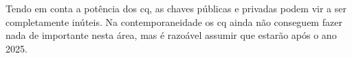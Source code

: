 \documentclass{report}
\begin{document}
\begin{figure}[!h]
	\centering
	\qquad
\end{figure}	

	Tendo em conta a potência dos \ac{cq}, as chaves públicas e privadas podem vir a ser completamente inúteis. Na contemporaneidade os \ac{cq} ainda não conseguem fazer nada de importante nesta área, mas é razoável assumir que estarão após o ano 2025. 
	
\end{document}

